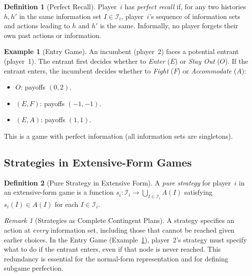 \documentclass[11pt,a4paper]{article}
\theoremstyle{definition}
\newtheorem{definition}{Definition}[section]
\newtheorem{example}{Example}[section]
\theoremstyle{plain}
\theoremstyle{remark}
\newtheorem{remark}{Remark}[section]
\begin{document}
\begin{definition}[Perfect Recall]
\label{def:perfect_recall}
Player~$i$ has \emph{perfect recall} if, for any two histories $h, h'$ in the same
information set $I \in \mathcal{I}_i$, player~$i$'s sequence of information sets and
actions leading to $h$ and $h'$ is the same. Informally, no player forgets their own
past actions or information.
\end{definition}

\begin{example}[Entry Game]
\label{ex:entry}
An incumbent (player~2) faces a potential entrant (player~1). The entrant first
decides whether to \emph{Enter} ($E$) or \emph{Stay Out} ($O$). If the entrant enters,
the incumbent decides whether to \emph{Fight} ($F$) or \emph{Accommodate} ($A$):
\begin{itemize}[nosep]
    \item $O$: payoffs $(0, 2)$.
    \item $(E, F)$: payoffs $(-1, -1)$.
    \item $(E, A)$: payoffs $(1, 1)$.
\end{itemize}
This is a game with perfect information (all information sets are singletons).
\end{example}

\subsection{Strategies in Extensive-Form Games}
\label{subsec:strategies_extensive}

\begin{definition}[Pure Strategy in Extensive Form]
\label{def:strategy_extensive}
A \emph{pure strategy} for player~$i$ in an extensive-form game is a function
$s_i : \mathcal{I}_i \to \bigcup_{I \in \mathcal{I}_i} A(I)$ satisfying
$s_i(I) \in A(I)$ for each $I \in \mathcal{I}_i$.
\end{definition}

\begin{remark}[Strategies as Complete Contingent Plans]
\label{rem:contingent}
A strategy specifies an action at \emph{every} information set, including those that
cannot be reached given earlier choices. In the Entry Game (Example~\ref{ex:entry}),
player~2's strategy must specify what to do if the entrant enters, even if that
node is never reached. This redundancy is essential for the normal-form representation
and for defining subgame perfection.
\end{remark}
\end{document}
